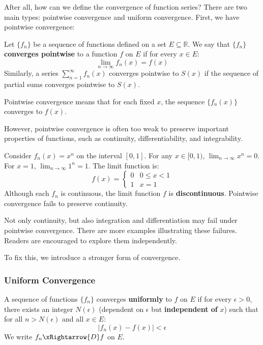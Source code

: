 After all, how can we define the convergence of function series? There are two main types: pointwise convergence and uniform convergence. First, we have pointwise convergence:

\begin{definition}
Let $\{f_n\}$ be a sequence of functions defined on a set $E \subseteq \mathbb{R}$. We say that $\{f_n\}$ \textbf{converges pointwise} to a function $f$ on $E$ if for every $x \in E$:
\[ \lim_{n \to \infty} f_n(x) = f(x) \]
Similarly, a series $\sum_{n=1}^{\infty} f_n(x)$ converges pointwise to $S(x)$ if the sequence of partial sums converges pointwise to $S(x)$.
\end{definition}

Pointwise convergence means that for each fixed $x$, the sequence $\{f_n(x)\}$ converges to $f(x)$.

However, pointwise convergence is often too weak to preserve important properties of functions, such as continuity, differentiability, and integrability.

\begin{example}
Consider $f_n(x) = x^n$ on the interval $[0, 1]$.
For any $x \in [0, 1)$, $\lim_{n \to \infty} x^n = 0$. For $x = 1$, $\lim_{n \to \infty} 1^n = 1$.
The limit function is:
\[ f(x) = \begin{cases} 0 & 0 \le x < 1 \\ 1 & x = 1 \end{cases} \]
Although each $f_n$ is continuous, the limit function $f$ is \textbf{discontinuous}. Pointwise convergence fails to preserve continuity.
\end{example}

Not only continuity, but also integration and differentiation may fail under pointwise convergence. There are more examples illustrating these failures. Readers are encouraged to explore them independently.

To fix this, we introduce a stronger form of convergence.

\subsubsection{Uniform Convergence}

\begin{definition}
A sequence of functions $\{f_n\}$ converges \textbf{uniformly} to $f$ on $E$ if for every $\epsilon > 0$, there exists an integer $N(\epsilon)$ (dependent on $\epsilon$ but \textbf{independent of} $x$) such that for all $n > N(\epsilon)$ and all $x \in E$:
\[ |f_n(x) - f(x)| < \epsilon \]
We write $f_n \xRightarrow{D} f$ on $E$.
\end{definition}

